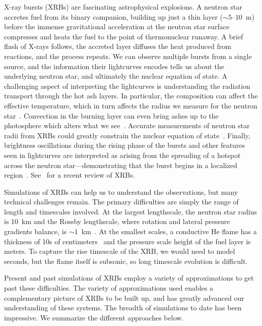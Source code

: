 \documentclass[a4paper]{jpconf}
\begin{document}
X-ray bursts (XRBs) are fascinating astrophysical explosions.  A
neutron star accretes fuel from its binary companion, building up just
a thin layer ($\sim 5$--$10$~m) before the immense gravitational
acceleration at the neutron star surface compresses and heats the fuel
to the point of thermonuclear runaway.  A brief flash of X-rays
follows, the accreted layer diffuses the heat produced from reactions,
and the process repeats.  We can observe multiple bursts from a single
source, and the information their lightcurves encodes tells us about
the underlying neutron star, and ultimately the nuclear equation of
state.  A challenging aspect of interpreting the lightcurves is
understanding the radiation transport through the hot ash layers.  In
particular, the composition can affect the effective temperature,
which in turn affects the radius we measure for the neutron
star~\cite{suleimanov:2011}.  Convection in the burning layer can even
bring ashes up to the photosphere which alters what we
see~\cite{kajava:2017}.  Accurate measurements of neutron star radii
from XRBs could greatly constrain the nuclear equation of
state~\cite{steiner:2010,ozel:2010}.  Finally, brightness oscillations
during the rising phase of the bursts
and other features seen in lightcurves are interpreted as arising from
the spreading of a hotspot across the neutron star---demonstrating
that the burst begins in a localized
region~\cite{bhattacharyya:2006,bhattacharyya:2007}.
See~\cite{galloway:2017} for a recent review of XRBs.

Simulations of XRBs can help us to understand the observations, but
many technical challenges remain.  The primary difficulties are simply
the range of length and timescales involved.  At the largest lengthscale,
the neutron star radius is 10~km and the Rossby lengthscale, where rotation
and lateral pressure gradients balance, is $\sim
1$~km~\cite{SPIT_ETAL02}.  At the smallest scales, a conductive He
flame has a thickness of 10s of centimeters~\cite{Timmes00} and the
pressure scale height of the fuel layer is meters.  To capture the
rise timescale of the XRB, we would need to model seconds, but the flame itself
is subsonic, so long timescale evolution is difficult.

Present and past simulations of XRBs employ a variety of
approximations to get past these difficulties.  The variety of
approximations used enables a complementary picture of XRBs to be built up,
and has greatly advanced our understanding of these systems.
The breadth of simulations to date has been impressive.  We summarize
the different approaches below.
\end{document}
